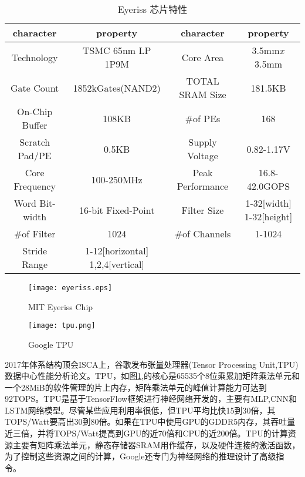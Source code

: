 \begin{table}[h]
\caption{Eyeriss 芯片特性}
\vspace{0.5em}\centering\wuhao
\begin{tabular}{cccc}
	\toprule[1.5pt]
		character & property & character & property\\
	\midrule[1pt]
		Technology & TSMC 65nm LP 1P9M & Core Area & 3.5mm$x$3.5mm\\
		Gate Count & 1852kGates(NAND2) & TOTAL SRAM Size & 181.5KB\\
		On-Chip Buffer & 108KB & \#of PEs & 168\\
		Scratch Pad/PE & 0.5KB & Supply Voltage & 0.82-1.17V\\
		Core Frequency & 100-250MHz & Peak Performance & 16.8-42.0GOPS\\
		Word Bit-width & 16-bit Fixed-Point & Filter Size & 1-32[width] 1-32[height]\\
		\#of Filter & 1024 & \#of Channels & 1-1024\\
		Stride Range & 1-12[horizontal] 1,2,4[vertical] & & \\
	\bottomrule[1.5pt]
\end{tabular}
\label{eyerisscharacter}
\end{table}

\begin{figure}[h]
\begin{minipage}{0.5\linewidth}
\centering
\texttt{[image: eyeriss.eps]}
\caption{MIT Eyeriss Chip}
\label{eyeriss}
\end{minipage}
\begin{minipage}{0.5\linewidth}
\centering
\texttt{[image: tpu.png]}
\caption{Google TPU}
\label{tpu}
\end{minipage}
\end{figure}

2017年体系结构顶会ISCA上，谷歌发布张量处理器(Tensor Processing Unit,TPU)数据中心性能分析论文\cite{jouppi2017datacenter}。TPU，如图\ref{tpu},的核心是65535个8位乘累加矩阵乘法单元和一个28MiB的软件管理的片上内存，矩阵乘法单元的峰值计算能力可达到92TOPS。TPU是基于TensorFlow框架进行神经网络开发的，主要有MLP,CNN和LSTM网络模型。尽管某些应用利用率很低，但TPU平均比快15到30倍，其TOPS/Watt要高出30到80倍。如果在TPU中使用GPU的GDDR5内存，其吞吐量近三倍，并将TOPS/Watt提高到GPU的近70倍和CPU的近200倍。TPU的计算资源主要有矩阵乘法单元，静态存储器SRAM用作缓存，以及硬件连接的激活函数，为了控制这些资源之间的计算，Google还专门为神经网络的推理设计了高级指令。

